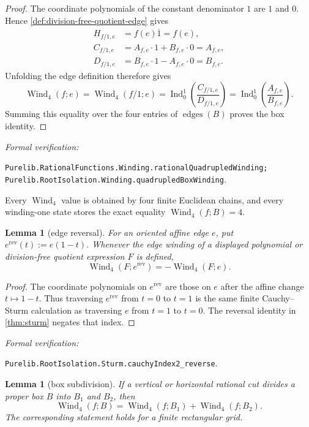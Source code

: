\documentclass[11pt]{article}
\newtheorem{lemma}[theorem]{Lemma}
\newcommand{\Wind}{\operatorname{Wind}}
\newcommand{\Ind}{\operatorname{Ind}}
\newcommand{\leanref}[1]{\par\smallskip\noindent
  \emph{Formal verification:}\par\nobreak
  {\raggedright\nolinkurl{#1}.\par}}
\begin{document}
\begin{proof}
The coordinate polynomials of the constant denominator $1$ are $1$ and
$0$.  Hence \cref{def:division-free-quotient-edge} gives
\[
 \begin{aligned}
 H_{f/1,e}
   &=f(e)\overline{1}=f(e),\\
 C_{f/1,e}
   &=A_{f,e}\cdot1+B_{f,e}\cdot0=A_{f,e},\\
 D_{f/1,e}
   &=B_{f,e}\cdot1-A_{f,e}\cdot0=B_{f,e}.
 \end{aligned}
\]
Unfolding the edge definition therefore gives
\[
 \Wind_4(f;e)
   =\Wind_4(f/1;e)
   =\Ind_0^1\!\left(\frac{C_{f/1,e}}{D_{f/1,e}}\right)
   =\Ind_0^1\!\left(\frac{A_{f,e}}{B_{f,e}}\right).
\]
Summing this equality over the four entries of
$\operatorname{edges}(B)$ proves the box identity.
\end{proof}

\leanref{Purelib.RationalFunctions.Winding.rationalQuadrupledWinding;
Purelib.RootIsolation.Winding.quadrupledBoxWinding}

Every $\Wind_4$ value is obtained by four finite Euclidean chains, and every
winding-one state stores the exact equality $\Wind_4(f;B)=4$.

\begin{lemma}[edge reversal]
\label{lem:winding-edge-reversal}
For an oriented affine edge $e$, put $e^{\mathrm{rev}}(t):=e(1-t)$.
Whenever the edge winding of a displayed polynomial or division-free
quotient expression $F$ is defined,
\[
             \Wind_4(F;e^{\mathrm{rev}})=-\Wind_4(F;e).
\]
\end{lemma}

\begin{proof}
The coordinate polynomials on $e^{\mathrm{rev}}$ are those on $e$ after the
affine change $t\mapsto1-t$.  Thus traversing $e^{\mathrm{rev}}$ from
$t=0$ to $t=1$ is the same finite Cauchy--Sturm calculation as traversing
$e$ from $t=1$ to $t=0$.  The reversal identity in \cref{thm:sturm} negates
that index.
\end{proof}

\leanref{Purelib.RootIsolation.Sturm.cauchyIndex2_reverse}

\begin{lemma}[box subdivision]
\label{lem:winding-add}
If a vertical or horizontal rational cut divides a proper box $B$ into
$B_1$ and $B_2$, then
\[
       \Wind_4(f;B)=\Wind_4(f;B_1)+\Wind_4(f;B_2).
\]
The corresponding statement holds for a finite rectangular grid.
\end{lemma}
\end{document}
